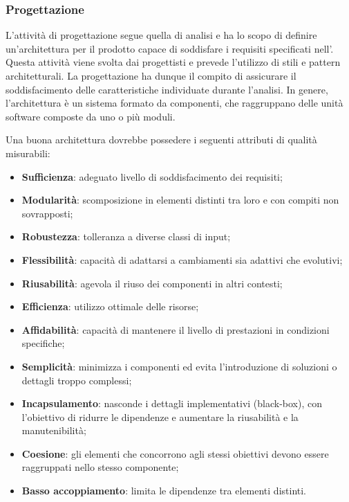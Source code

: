 \subsubsection{Progettazione}\label{progettazione}
\par L'attività di progettazione segue quella di analisi e ha lo scopo di definire un'architettura per il prodotto capace di soddisfare i requisiti specificati nell’\AnalisiDeiRequisiti. Questa attività viene svolta dai progettisti e prevede l'utilizzo di stili e pattern architetturali. La progettazione ha dunque il compito di assicurare il soddisfacimento delle caratteristiche individuate durante l'analisi. In genere, l'architettura è un sistema formato da componenti, che raggruppano delle unità software composte da uno o più moduli.

\par Una buona architettura dovrebbe possedere i seguenti attributi di qualità misurabili:
\begin{itemize}
  \item \textbf{Sufficienza}: adeguato livello di soddisfacimento dei requisiti;
  \item \textbf{Modularità}: scomposizione in elementi distinti tra loro e con compiti non sovrapposti;
  \item \textbf{Robustezza}: tolleranza a diverse classi di input;
  \item \textbf{Flessibilità}: capacità di adattarsi a cambiamenti sia adattivi che evolutivi;
  \item \textbf{Riusabilità}: agevola il riuso dei componenti in altri contesti;
  \item \textbf{Efficienza}: utilizzo ottimale delle risorse;
  \item \textbf{Affidabilità}: capacità di mantenere il livello di prestazioni in condizioni specifiche;
  \item \textbf{Semplicità}: minimizza i componenti ed evita l'introduzione di soluzioni o dettagli troppo complessi;
  \item \textbf{Incapsulamento}: nasconde i dettagli implementativi (black-box), con l'obiettivo di ridurre le dipendenze e aumentare la riusabilità e la manutenibilità;
  \item \textbf{Coesione}: gli elementi che concorrono agli stessi obiettivi devono essere raggruppati nello stesso componente;
  \item \textbf{Basso accoppiamento}: limita le dipendenze tra elementi distinti.
\end{itemize}

